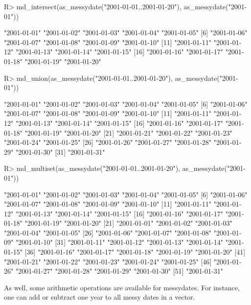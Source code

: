 \documentclass[
]{jss}
\begin{document}
\begin{CodeChunk}
\begin{CodeInput}
R> md_intersect(as_messydate("2001-01-01..2001-01-20"), as_messydate("2001-01"))
\end{CodeInput}
\begin{CodeOutput}
 [1] "2001-01-01" "2001-01-02" "2001-01-03" "2001-01-04" "2001-01-05"
 [6] "2001-01-06" "2001-01-07" "2001-01-08" "2001-01-09" "2001-01-10"
[11] "2001-01-11" "2001-01-12" "2001-01-13" "2001-01-14" "2001-01-15"
[16] "2001-01-16" "2001-01-17" "2001-01-18" "2001-01-19" "2001-01-20"
\end{CodeOutput}
\begin{CodeInput}
R> md_union(as_messydate("2001-01-01..2001-01-20"), as_messydate("2001-01"))
\end{CodeInput}
\begin{CodeOutput}
 [1] "2001-01-01" "2001-01-02" "2001-01-03" "2001-01-04" "2001-01-05"
 [6] "2001-01-06" "2001-01-07" "2001-01-08" "2001-01-09" "2001-01-10"
[11] "2001-01-11" "2001-01-12" "2001-01-13" "2001-01-14" "2001-01-15"
[16] "2001-01-16" "2001-01-17" "2001-01-18" "2001-01-19" "2001-01-20"
[21] "2001-01-21" "2001-01-22" "2001-01-23" "2001-01-24" "2001-01-25"
[26] "2001-01-26" "2001-01-27" "2001-01-28" "2001-01-29" "2001-01-30"
[31] "2001-01-31"
\end{CodeOutput}
\begin{CodeInput}
R> md_multiset(as_messydate("2001-01-01..2001-01-20"), as_messydate("2001-01"))
\end{CodeInput}
\begin{CodeOutput}
 [1] "2001-01-01" "2001-01-02" "2001-01-03" "2001-01-04" "2001-01-05"
 [6] "2001-01-06" "2001-01-07" "2001-01-08" "2001-01-09" "2001-01-10"
[11] "2001-01-11" "2001-01-12" "2001-01-13" "2001-01-14" "2001-01-15"
[16] "2001-01-16" "2001-01-17" "2001-01-18" "2001-01-19" "2001-01-20"
[21] "2001-01-01" "2001-01-02" "2001-01-03" "2001-01-04" "2001-01-05"
[26] "2001-01-06" "2001-01-07" "2001-01-08" "2001-01-09" "2001-01-10"
[31] "2001-01-11" "2001-01-12" "2001-01-13" "2001-01-14" "2001-01-15"
[36] "2001-01-16" "2001-01-17" "2001-01-18" "2001-01-19" "2001-01-20"
[41] "2001-01-21" "2001-01-22" "2001-01-23" "2001-01-24" "2001-01-25"
[46] "2001-01-26" "2001-01-27" "2001-01-28" "2001-01-29" "2001-01-30"
[51] "2001-01-31"
\end{CodeOutput}
\end{CodeChunk}

As well, some arithmetic operations are available for messydates. For
instance, one can add or subtract one year to all messy dates in a
vector.
\end{document}
